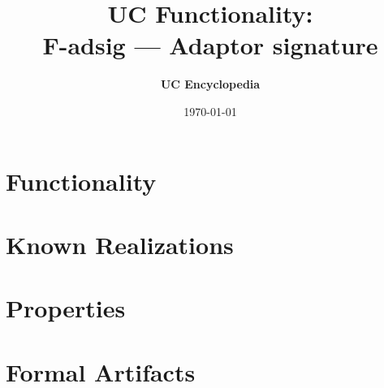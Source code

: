 \documentclass[11pt,a4paper]{article}
\title{\textbf{\Large UC Functionality:}\\[0.2em] \Large F-adsig --- Adaptor signature}
\author{\textbf{UC Encyclopedia}}
\date{\today}
\newtheorem{functionality}{Functionality}
\begin{document}
\maketitle

\begin{abstract}
\end{abstract}

\section{Functionality}

%

\section{Known Realizations}


\section{Properties}


\section{Formal Artifacts}

\end{document}
